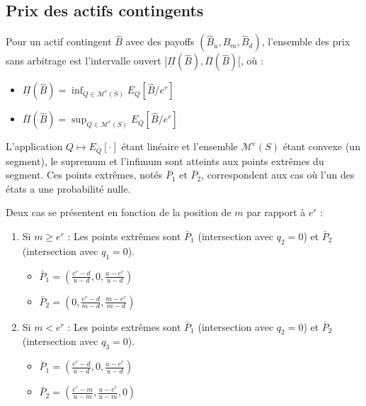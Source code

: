 \subsection{Prix des actifs contingents}
Pour un actif contingent $\hat{B}$ avec des payoffs $(\hat{B}_u, \hat{B}_m, \hat{B}_d)$, l'ensemble des prix sans arbitrage est l'intervalle ouvert $]\underline{\Pi}(\hat{B}), \overline{\Pi}(\hat{B})[$, où :
\begin{itemize}
    \item $\underline{\Pi}(\hat{B}) = \inf_{Q \in \mathcal{M}^e(S)} E_Q[\hat{B}/e^r]$
    \item $\overline{\Pi}(\hat{B}) = \sup_{Q \in \mathcal{M}^e(S)} E_Q[\hat{B}/e^r]$
\end{itemize}
L'application $Q \mapsto E_Q[\cdot]$ étant linéaire et l'ensemble $\mathcal{M}^e(S)$ étant convexe (un segment), le supremum et l'infimum sont atteints aux points extrêmes du segment. Ces points extrêmes, notés $\bar{P}_1$ et $\bar{P}_2$, correspondent aux cas où l'un des états a une probabilité nulle.

Deux cas se présentent en fonction de la position de $m$ par rapport à $e^r$ :
\begin{enumerate}
    \item Si $m \ge e^r$ : Les points extrêmes sont $\bar{P}_1$ (intersection avec $q_2=0$) et $\bar{P}_2$ (intersection avec $q_1=0$).
        \begin{itemize}
            \item $\bar{P}_1 = (\frac{e^r-d}{u-d}, 0, \frac{u-e^r}{u-d})$
            \item $\bar{P}_2 = (0, \frac{e^r-d}{m-d}, \frac{m-e^r}{m-d})$
        \end{itemize}
    \item Si $m < e^r$ : Les points extrêmes sont $\bar{P}_1$ (intersection avec $q_2=0$) et $\bar{P}_2$ (intersection avec $q_3=0$).
        \begin{itemize}
            \item $\bar{P}_1 = (\frac{e^r-d}{u-d}, 0, \frac{u-e^r}{u-d})$
            \item $\bar{P}_2 = (\frac{e^r-m}{u-m}, \frac{u-e^r}{u-m}, 0)$
        \end{itemize}
\end{enumerate}

